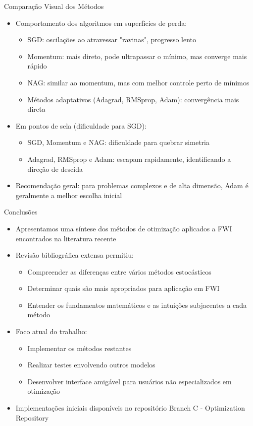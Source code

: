 \documentclass[aspectratio=1610]{beamer}
\begin{document}
\begin{frame}{Comparação Visual dos Métodos}
\begin{itemize}
    \item Comportamento dos algoritmos em superfícies de perda:
    \begin{itemize}
        \item SGD: oscilações ao atravessar "ravinas", progresso lento
        \item Momentum: mais direto, pode ultrapassar o mínimo, mas converge mais rápido
        \item NAG: similar ao momentum, mas com melhor controle perto de mínimos
        \item Métodos adaptativos (Adagrad, RMSprop, Adam): convergência mais direta
    \end{itemize}
    \item Em pontos de sela (dificuldade para SGD):
    \begin{itemize}
        \item SGD, Momentum e NAG: dificuldade para quebrar simetria 
        \item Adagrad, RMSprop e Adam: escapam rapidamente, identificando a direção de descida
    \end{itemize}
    \item Recomendação geral: para problemas complexos e de alta dimensão, Adam é geralmente a melhor escolha inicial
\end{itemize}
\end{frame}

\begin{frame}{Conclusões}
\begin{itemize}
    \item Apresentamos uma síntese dos métodos de otimização aplicados a FWI encontrados na literatura recente
    \item Revisão bibliográfica extensa permitiu:
    \begin{itemize}
        \item Compreender as diferenças entre vários métodos estocásticos
        \item Determinar quais são mais apropriados para aplicação em FWI
        \item Entender os fundamentos matemáticos e as intuições subjacentes a cada método
    \end{itemize}
    \item Foco atual do trabalho:
    \begin{itemize}
        \item Implementar os métodos restantes
        \item Realizar testes envolvendo outros modelos
        \item Desenvolver interface amigável para usuários não especializados em otimização
    \end{itemize}
    \item Implementações iniciais disponíveis no repositório Branch C - Optimization Repository
\end{itemize}
\end{frame}
\end{document}
